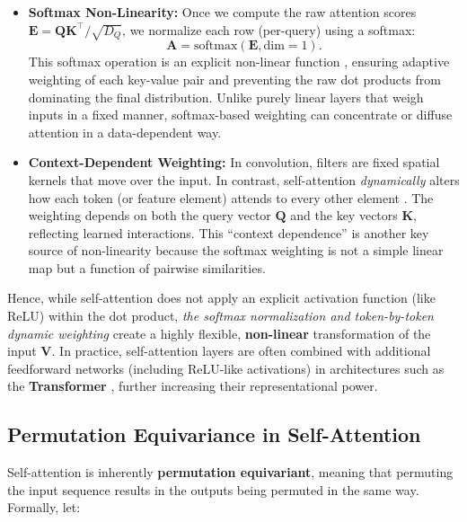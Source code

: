 \begin{itemize}
    \item \textbf{Softmax Non-Linearity:} 
    Once we compute the raw attention scores \(\mathbf{E} = \mathbf{Q}\mathbf{K}^\top / \sqrt{D_Q}\), we normalize each row (per-query) using a softmax:
    \[
    \mathbf{A} = \mathrm{softmax}(\mathbf{E}, \text{dim} = 1).
    \]
    This softmax operation is an explicit non-linear function \cite{vaswani2017_attention}, ensuring adaptive weighting of each key-value pair and preventing the raw dot products from dominating the final distribution. Unlike purely linear layers that weigh inputs in a fixed manner, softmax-based weighting can concentrate or diffuse attention in a data-dependent way.
    
    \item \textbf{Context-Dependent Weighting:}
    In convolution, filters are fixed spatial kernels that move over the input. In contrast, self-attention \emph{dynamically} alters how each token (or feature element) attends to every other element \cite{bahdanau2016_neural,vaswani2017_attention}. The weighting depends on both the query vector \(\mathbf{Q}\) and the key vectors \(\mathbf{K}\), reflecting learned interactions. This “context dependence” is another key source of non-linearity because the softmax weighting is not a simple linear map but a function of pairwise similarities.
    
\end{itemize}

\noindent
Hence, while self-attention does not apply an explicit activation function (like ReLU) within the dot product, \emph{the softmax normalization and token-by-token dynamic weighting} create a highly flexible, \textbf{non-linear} transformation of the input \(\mathbf{V}\). In practice, self-attention layers are often combined with additional feedforward networks (including ReLU-like activations) in architectures such as the \textbf{Transformer} \cite{vaswani2017_attention}, further increasing their representational power.

\newpage
\subsection{Permutation Equivariance in Self-Attention}

\noindent Self-attention is inherently \textbf{permutation equivariant}, meaning that permuting the input sequence results in the outputs being permuted in the same way. Formally, let:

